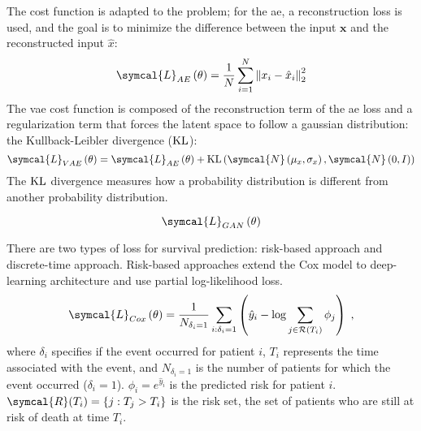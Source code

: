 \documentclass[../main.tex]{subfiles}
\begin{document}
	 The cost function is adapted to the problem; for the \gls{ae}, a reconstruction loss is used, and the goal is to minimize the difference between the input \(\symbf{x}\) and the reconstructed input \(\hat{x}\):
	 \begin{equation}
		 \symcal{L}_{AE}\left(\theta\right) = \frac{1}{N}\sum_{i=1}^{N} {\left\|x_i - \hat{x}_i \right\|}_2^{2}
	 \end{equation}
	 The \gls{vae} cost function is composed of the reconstruction term of the \gls{ae} loss and a regularization term that forces the latent space to follow a gaussian distribution: the Kullback-Leibler divergence (\(\operatorname{KL}\)):
	 \begin{equation}
		 \symcal{L}_{VAE}\left(\theta\right) = \symcal{L}_{AE}\left(\theta\right) + \KL\left(\symcal{N}\left(\mu_{x}, \sigma_{x}\right), \symcal{N}\left(0, I\right)\right)
	 \end{equation}
	 The \(\operatorname{KL}\) divergence measures how a probability distribution is different from another probability distribution.

	 \begin{equation}
		 \symcal{L}_{GAN}\left(\theta\right)
	 \end{equation}

	 There are two types of loss for survival prediction: risk-based approach and discrete-time approach.
	 Risk-based approaches extend the Cox model to deep-learning architecture and use partial log-likelihood loss.
	 \begin{equation}
		 \symcal{L}_{Cox}\left(\theta\right) = \frac{1}{N_{\delta_i = 1}} \sum_{i:\delta_i=1} \left(\hat{y}_i - \log \sum_{j \in \mathcal{R}(T_i)}\phi_j \right)\; \text{,} \label{eq:cox_loss}
	 \end{equation}
	 where \(\delta_i\) specifies if the event occurred for patient \(i\), \(T_i\) represents the time associated with the event, and \(N_{\delta_i = 1}\) is the number of patients for which the event occurred (\(\delta_i = 1\)).
	 \(\phi_i = e^{\hat{y}_i}\) is the predicted risk for patient \(i\).
	 \(\symcal{R}(T_i) = \{j: T_j > T_i\}\) is the risk set, the set of patients who are still at risk of death at time \(T_i\).
\end{document}
